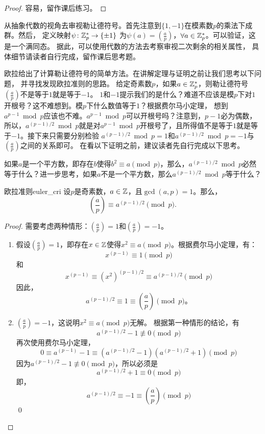    \begin{proof}
   容易，留作课后练习。
   \end{proof}
从抽象代数的视角去审视勒让德符号。首先注意到$\{1, -1\}$在模素数$p$的乘法下成群。然后，
定义映射$\psi\colon {\mathbb Z}_p^* \to \{ \pm 1 \}$
 为$\psi(a) =  \left(\frac{a}{p}\right)$，$\forall a \in {\mathbb Z}_p^*$。可以验证，这是一个满同态。
 据此，可以使用代数的方法去考察审视二次剩余的相关属性，
 具体细节请读者自行完成，留作课后思考题。
 
欧拉给出了计算勒让德符号的简单方法。在讲解定理与证明之前让我们思考以下问题，
并寻找发现欧拉准则的思路。
给定奇素数$p$，如果$a \in {\mathbb Z}_p^*$，则勒让德符号$\left(\frac{a}{p}\right)$不是等于$1$就是等于$-1$。
$1$和$-1$提示我们的是什么？难道不应该是模$p$下对$1$开根号？这不难想到。模$p$下什么数值等于$1$？根据费尔马小定理，
想到$a^{p-1} \bmod p$应该也不难。$a^{p-1} \bmod p$可以开根号吗？注意到，$p-1$必为偶数，
所以，$a^{(p-1)/2} \bmod p$就是对$a^{p-1} \bmod p$开根号了，且所得值不是等于$1$就是等于$-1$。接下来只需要分别检验
$a^{(p-1)/2} \bmod p=1$和$a^{(p-1)/2} \bmod p=-1$与$\left(\frac{a}{p}\right)$之间的关系即可。
在看以下证明之前，建议读者先自行完成以下思考。
\begin{thinking}
  如果$a$是一个平方数，即存在$b$使得$b^2 \equiv  a \pmod{p}$，那么，$a^{(p-1)/2} \bmod p$必然等于什么？进一步思考，如果$a$不是一个平方数，那么$a^{(p-1)/2} \bmod p$等于什么？
\end{thinking}

 \begin{theorem}{欧拉准则}{euler_cri}
 设$p$是奇素数，$a \in {\mathbb Z}$，且$\gcd(a,p)=1$。那么，
 \[
 \left(\frac{a}{p} \right) \equiv a^{(p-1)/2} \pmod{p}.
 \]
 \end{theorem}
 
 \begin{proof}
 需要考虑两种情形：$\left(\frac{a}{p} \right) = 1$和$\left(\frac{a}{p} \right) = -1$。
 \begin{enumerate}
 \item 假设$\left(\frac{a}{p} \right) = 1$，即存在$x \in {\mathbb Z}$使得$x^2 \equiv a \pmod{p}$。根据费尔马小定理，有：
 \[x^{(p-1)} \equiv 1 \pmod{p}\]
  和
  \[x^{(p-1)}\equiv (x^2)^{(p-1)/2} \equiv a^{(p-1)/2} \pmod{p}\]
  因此，\[a^{(p-1)/2} \equiv 1 \equiv \left(\frac{a}{p} \right) \pmod{p}\text{。}\]
  
  \item $\left(\frac{a}{p} \right) = -1$，这说明$x^2 \equiv a \pmod{p}$无解。
  根据第一种情形的结论，有
  \[a^{(p-1)/2} -1 \not\equiv 0 \pmod{p}\]
  再次使用费尔马小定理，
  \[0 \equiv a^{(p-1)} -1 \equiv (a^{(p-1)/2} - 1)(a^{(p-1)/2} + 1) \pmod{p} \]
  因为$a^{(p-1)/2} -1 \not\equiv 0 \pmod{p}$，所以必须是\[a^{(p-1)/2} + 1 \equiv 0 \pmod{p}\] 
   即，
   \[a^{(p-1)/2} \equiv -1 \equiv  \left(\frac{a}{p} \right) \pmod{p}\]\qed
 \end{enumerate}
 \end{proof}
 
